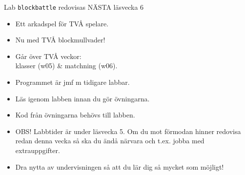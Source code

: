 \begin{SlideExtra}{Lab \texttt{blockbattle} redovisas NÄSTA läsvecka 6}
\begin{minipage}{0.59\textwidth}
    \begin{itemize}\SlideFontTiny
      \item Ett arkadspel för TVÅ spelare.
      \item Nu med TVÅ blockmullvader!
      \item Går över TVÅ veckor:\\klasser (w05) \& matchning (w06).
      \item Programmet  är  jmf m tidigare labbar.
      \item Läs igenom labben innan du gör övningarna.
      \item Kod från övningarna behövs till labben. 
      \item OBS! Labbtider är  under läsvecka 5. Om du mot förmodan hinner redovisa redan denna vecka så ska du ändå närvara och t.ex. jobba med extrauppgifter. 
      \item Dra nytta av undervisningen så att du lär dig så mycket som möjligt!  
    \end{itemize}    
  \end{minipage}
\end{SlideExtra}
  
\fi

